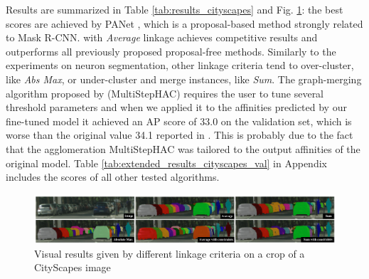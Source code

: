 Results are summarized in Table \ref{tab:results_cityscapes} and Fig. \ref{fig:cityscapes}: the best scores are achieved by PANet \cite{liu2018path}, which is a proposal-based method strongly related to Mask R-CNN. \algname{} with \emph{Average} linkage achieves competitive results and outperforms all previously proposed proposal-free methods. Similarly to the experiments on neuron segmentation, other linkage criteria tend to over-cluster, like \emph{Abs Max}, or under-cluster and merge instances, like \emph{Sum}. The graph-merging algorithm proposed by \cite{liu2018affinity} (MultiStepHAC) requires the user to tune several threshold parameters and when we applied it to the affinities predicted by our fine-tuned model it achieved an AP score of 33.0 on the validation set, which is worse than the original value 34.1 reported in \cite{liu2018affinity}. This is probably due to the fact that the agglomeration MultiStepHAC was tailored to the output affinities of the original model. 
Table \ref{tab:extended_results_cityscapes_val} in Appendix includes the scores of all other tested \algname{} algorithms.
\begin{figure}
\centering
\includegraphics[width=\textwidth]{./figs/cityscapes_compare_4.pdf} %
\caption{Visual results given by different \algname{} linkage criteria on a crop of a CityScapes image}\label{fig:cityscapes}
\end{figure}
